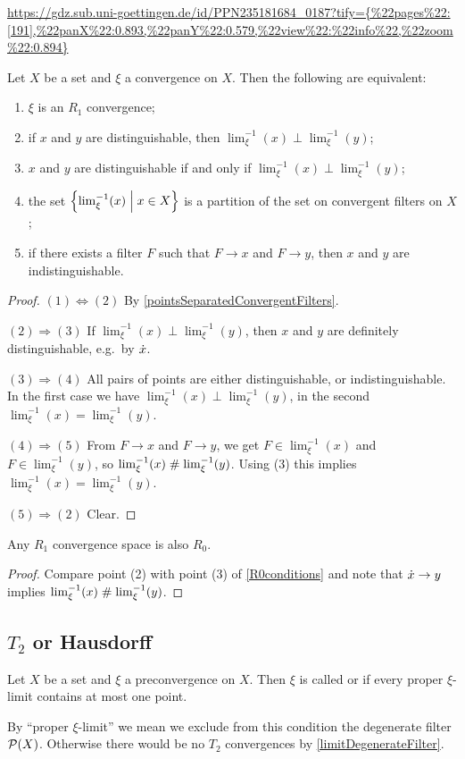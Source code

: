 \url{https://gdz.sub.uni-goettingen.de/id/PPN235181684_0187?tify={%


\begin{proposition}
Let $X$ be a set and $\xi$ a convergence on $X$. Then the following are equivalent:
\begin{enumerate}
\item $\xi$ is an $R_1$ convergence;
\item if $x$ and $y$ are distinguishable, then $\lim_\xi^{-1}(x)\perp \lim_\xi^{-1}(y)$;
\item $x$ and $y$ are distinguishable \textup{if and only if} $\lim_\xi^{-1}(x)\perp \lim_\xi^{-1}(y)$;
\item the set $\left\{ \lim^{-1}_\xi(x) \;\middle|\; x\in X \right\}$ is a partition of the set on convergent filters on $X$;
\item if there exists a filter $F$ such that $F \to x$ and $F \to y$, then $x$ and $y$ are indistinguishable.
\end{enumerate}
\end{proposition}
\begin{proof}
$(1) \Leftrightarrow (2)$ By \ref{pointsSeparatedConvergentFilters}.

$(2) \Rightarrow (3)$ If $\lim_\xi^{-1}(x)\perp \lim_\xi^{-1}(y)$, then $x$ and $y$ are definitely distinguishable, e.g.\ by $\dot{x}$.

$(3) \Rightarrow (4)$ All pairs of points are either distinguishable, or indistinguishable. In the first case we have $\lim_\xi^{-1}(x)\perp \lim_\xi^{-1}(y)$, in the second $\lim_\xi^{-1}(x) = \lim_\xi^{-1}(y)$.

$(4) \Rightarrow (5)$ From $F\to x$ and $F\to y$, we get $F\in \lim_\xi^{-1}(x)$ and $F\in \lim_\xi^{-1}(y)$, so $\lim_\xi^{-1}(x)\mathrel{\#} \lim_\xi^{-1}(y)$. Using (3) this implies $\lim_\xi^{-1}(x) = \lim_\xi^{-1}(y)$.

$(5) \Rightarrow (2)$ Clear.
\end{proof}
\begin{corollary}
Any $R_1$ convergence space is also $R_0$.
\end{corollary}
\begin{proof}
Compare point (2) with point (3) of \ref{R0conditions} and note that $\dot{x}\to y$ implies $\lim_\xi^{-1}(x)\mathrel{\#} \lim_\xi^{-1}(y)$. 
\end{proof}


\subsection{$T_2$ or Hausdorff}
\begin{definition}
Let $X$ be a set and $\xi$ a preconvergence on $X$. Then $\xi$ is called  or  if every proper $\xi$-limit contains at most one point.
\end{definition}
By ``proper $\xi$-limit'' we mean we exclude from this condition the degenerate filter $\operatorname{\mathcal{P}}(X)$. Otherwise there would be no $T_2$ convergences by \ref{limitDegenerateFilter}.

